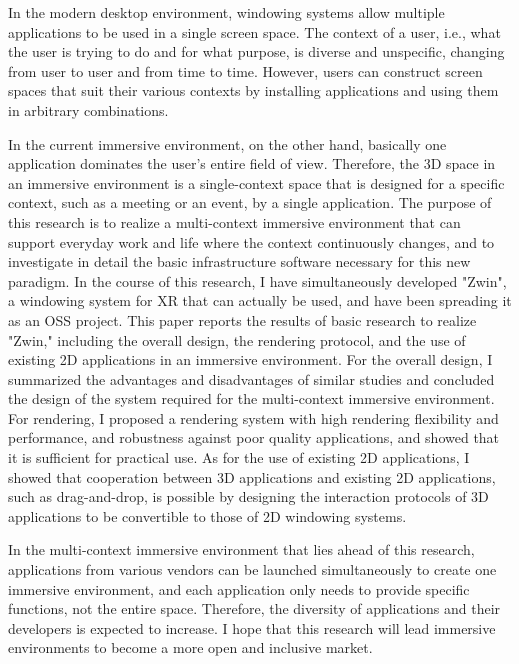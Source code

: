 In the modern desktop environment, windowing systems allow
multiple applications to be used in a single screen space.
The context of a user, i.e., what the user is trying to do and for
what purpose, is diverse and unspecific, changing from user to user and
from time to time.
However, users can construct screen spaces that suit their various contexts
by installing applications and using them in arbitrary combinations.

In the current immersive environment, on the other hand,
basically one application dominates the user's entire field of view.
Therefore, the 3D space in an immersive environment is a single-context space
that is designed for a specific context, such as a meeting or an event,
by a single application.
The purpose of this research is to realize a multi-context immersive environment
that can support everyday work and life where the context continuously changes,
and to investigate in detail the basic infrastructure software necessary
for this new paradigm.
In the course of this research, I have simultaneously developed "Zwin",
a windowing system for XR that can actually be used, and have been spreading it
as an OSS project.
This paper reports the results of basic research to realize "Zwin,"
including the overall design, the rendering protocol,
and the use of existing 2D applications in an immersive environment.
For the overall design, I summarized the advantages and disadvantages of
similar studies and concluded the design of the system required for
the multi-context immersive environment.
For rendering, I proposed a rendering system with high rendering flexibility
and performance, and robustness against poor quality applications,
and showed that it is sufficient for practical use.
As for the use of existing 2D applications, I showed that cooperation
between 3D applications and existing 2D applications, such as drag-and-drop,
is possible by designing the interaction protocols of 3D applications
to be convertible to those of 2D windowing systems.

In the multi-context immersive environment that lies ahead of this research,
applications from various vendors can be launched simultaneously to create
one immersive environment, and each application only needs to provide
specific functions, not the entire space.
Therefore, the diversity of applications and their developers
is expected to increase.
I hope that this research will lead immersive environments to become
a more open and inclusive market.

